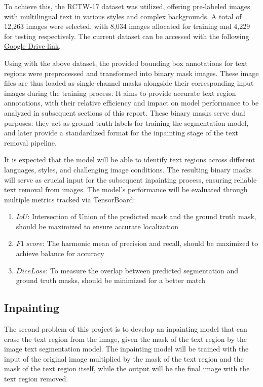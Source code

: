 \documentclass[10pt,twocolumn,letterpaper]{article}
\begin{document}
To achieve this, the RCTW-17 dataset was utilized, offering pre-labeled images with multilingual text in various styles and complex backgrounds. 
A total of 12,263 images were selected, with 8,034 images allocated for training and 4,229 for testing respectively. The current dataset can be accessed with the following 
\href{https://drive.google.com/drive/folders/1BbLe23KN1At6xsItvBcj9dXhPv6LdQH_?usp=sharing}{Google Drive link}.

Using with the above dataset, the provided bounding box annotations for text regions were preprocessed and transformed into binary mask images.
These image files are thus loaded as single-channel masks alongside their corresponding input images during the training process. 
It aims to provide accurate text region annotations, with their relative efficiency and impact on model performance to be analyzed in subsequent sections of this report. 
These binary masks serve dual purposes: they act as ground truth labels for training the segmentation model, and later provide a standardized format for the inpainting stage of the text removal pipeline.

It is expected that the model will be able to identify text regions across different languages, styles, and challenging image conditions. 
The resulting binary masks will serve as crucial input for the subsequent inpainting process, ensuring reliable text removal from images. 
The model's performance will be evaluated through multiple metrics tracked via TensorBoard:
\begin{enumerate}
    \item $IoU$: Intersection of Union of the predicted mask and the ground truth mask, should be maximized to ensure accurate localization
    \item $F1\;score$: The harmonic mean of precision and recall, should be maximized to achieve balance for accuracy 
    \item $Dice Loss$: To measure the overlap between predicted segmentation and ground truth masks, should be minimized for a better match
\end{enumerate}

\subsection{Inpainting}

The second problem of this project is to develop an inpainting model that can erase the text region from the image, given the mask of the text region by 
the image text segmentation model. The inpainting model will be trained with the input of the original image multiplied by the mask of the text region and 
the mask of the text region itself, while the output will be the final image with the text region removed.
\end{document}

